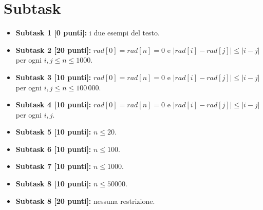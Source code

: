   \section*{Subtask}
  \begin{itemize}
    \item \textbf{Subtask 1 [0 punti]:} i due esempi del testo.
    \item \textbf{Subtask 2 [20 punti]:} $rad[0]=rad[n]=0$ e $|rad[i]-rad[j]|\leq |i-j|$ per ogni $i,j \leq n \leq 1000$.
    \item \textbf{Subtask 3 [10 punti]:} $rad[0]=rad[n]=0$ e $|rad[i]-rad[j]|\leq |i-j|$ per ogni $i,j \leq n \leq 100\,000$.
    \item \textbf{Subtask 4 [10 punti]:} $rad[0]=rad[n]=0$ e $|rad[i]-rad[j]|\leq |i-j|$ per ogni $i,j$.
    \item \textbf{Subtask 5 [10 punti]:} $n \leq 20$.
    \item \textbf{Subtask 6 [10 punti]:} $n \leq 100$.
    \item \textbf{Subtask 7 [10 punti]:} $n \leq 1000$.
    \item \textbf{Subtask 8 [10 punti]:} $n \leq 50000$.
    \item \textbf{Subtask 8 [20 punti]:} nessuna restrizione.
  \end{itemize}
  
